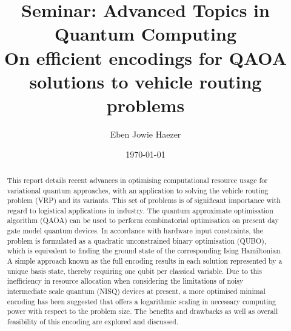 \documentclass [10pt]{article}
\title {
	{\Large Seminar: Advanced Topics in Quantum Computing \\}
	\vspace {0.4cm}
	On efficient encodings for QAOA \\
	solutions to vehicle routing problems
}
\author {Eben Jowie Haezer}
\date {\today}
\begin{document}
\vspace* {-1.8cm}
{\let \newpage \relax \maketitle}

\begin {abstract}
This report details recent advances in optimising computational resource usage
for variational quantum approaches, with an application to solving the vehicle
routing problem (VRP) and its variants. This set of problems is of significant
importance with regard to logistical applications in industry. The quantum
approximate optimisation algorithm (QAOA) can be used to perform combinatorial
optimisation on present day gate model quantum devices. In accordance with
hardware input constraints, the problem is formulated as a quadratic
unconstrained binary optimisation (QUBO), which is equivalent to finding the
ground state of the corresponding Ising Hamiltonian. A simple approach known as
the full encoding results in each solution represented by a unique basis state,
thereby requiring one qubit per classical variable. Due to this inefficiency in
resource allocation when considering the limitations of noisy intermediate scale
quantum (NISQ) devices at present, a more optimised minimal encoding has been
suggested that offers a logarithmic scaling in necessary computing power with
respect to the problem size. The benefits and drawbacks as well as overall
feasibility of this encoding are explored and discussed.
\end {abstract}
\end{document}
